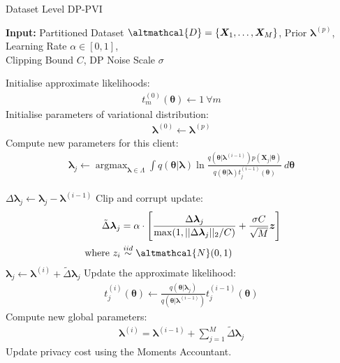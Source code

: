 \begin{algorithm}
	\caption{Dataset Level DP-PVI}
	\label{alg:dataset-DPPVI}
	\hspace*{\algorithmicindent} \textbf{Input:} Partitioned Dataset $\altmathcal{D} = \lbrace \bm{X}_1, \ldots, \bm{X}_M \rbrace$, Prior $\bm{\lambda} ^{(p)}$, Learning Rate $\alpha \in [0, 1]$,\\ 
	\hspace*{\algorithmicindent} Clipping Bound $C$, DP Noise Scale $\sigma$
	\begin{algorithmic}[1] %
		\State Initialise approximate likelihoods: \begin{align}
		t_m^{(0)}(\bm{\theta}) \leftarrow 1\ \forall m 
		\end{align} 
		\State Initialise parameters of variational distribution:
		\begin{align}
		\bm{\lambda}^{(0)} \leftarrow \bm{\lambda}^{(p)}
		\end{align} 
			 
			\State Compute new parameters for this client:
			\begin{align}
			\bm{\lambda}_j \leftarrow  \mathop{\mathrm{argmax}}_{\bm{\lambda} \in \Lambda} \int q(\bm{\theta} |\bm{\lambda}) \ln \frac{q(\bm{\theta} |\bm{\lambda}^{(i-1)}) p(\bm{X}_{j}|\bm{\theta})}{q(\bm{\theta}|\bm{\lambda}) t_{j}^{(i-1)}(\bm{\theta})}\ d\bm{\theta} \label{eq:param_local_free_energy_optimisation}
			\end{align}
			
			\State $\Delta \bm{\lambda}_j \leftarrow \bm{\lambda}_j  - \bm{\lambda}^{(i-1)}$
			\State Clip and corrupt update:
			\begin{align}
			\tilde{\Delta} \bm{\lambda}_j &= \alpha \cdot  \Bigg[ \frac{\Delta \bm{\lambda}_j }{\max (1, || \Delta \bm{\lambda}_j||_2 / C )} + \frac{\sigma C}{\sqrt{M}}\bm{z} \Bigg] \nonumber \\
			\text{ where } z_i &\stackrel{iid}{\sim} \altmathcal{N}(0, 1) 
			 \label{eq:dp-pvi:client-update}
			\end{align}
			\State $\bm{\lambda}_j \leftarrow  \bm{\lambda}^{(i)} + \tilde{\Delta} \bm{\lambda}_j$
			\State Update the approximate likelihood:
			\begin{align}
			t_{j}^{(i)}(\bm{\theta}) \leftarrow \frac{q(\bm{\theta}|\bm{\lambda}_j)}{q(\bm{\theta}|\bm{\lambda}^{(i-1)})} t_{j}^{(i-1)}(\bm{\theta})
			\end{align}
			\EndFor
			\State Compute new global parameters:
			\begin{align}
			\bm{\lambda}^{(i)} = \bm{\lambda}^{(i-1)}  + \sum_{j=1}^M \tilde{\Delta} \bm{\lambda}_j \label{eq:dp-pvi:central-update}
			\end{align}
			\State Update privacy cost using the Moments Accountant. 
			\EndFor
	\end{algorithmic}
\end{algorithm}

